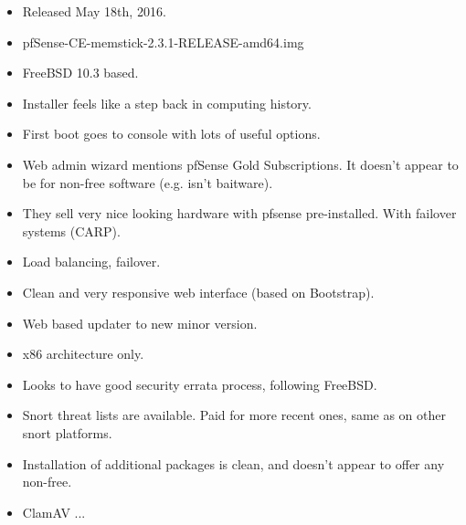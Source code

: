\begin{itemize}
 \item Released May 18th, 2016.
 \item pfSense-CE-memstick-2.3.1-RELEASE-amd64.img
 \item FreeBSD 10.3 based.
 \item Installer feels like a step back in computing history.
 \item First boot goes to console with lots of useful options.
 \item Web admin wizard mentions pfSense Gold Subscriptions. It doesn't appear to be for non-free software (e.g. isn't baitware).
 \item They sell very nice looking hardware with pfsense pre-installed. With failover systems (CARP).
 \item Load balancing, failover.
 \item Clean and very responsive web interface (based on Bootstrap).
 \item Web based updater to new minor version.
 \item x86 architecture only.
 \item Looks to have good security errata process, following FreeBSD.
 \item Snort threat lists are available. Paid for more recent ones, same as on other snort platforms.
 \item Installation of additional packages is clean, and doesn't appear to offer any non-free.
 \item ClamAV ...
\end{itemize}

